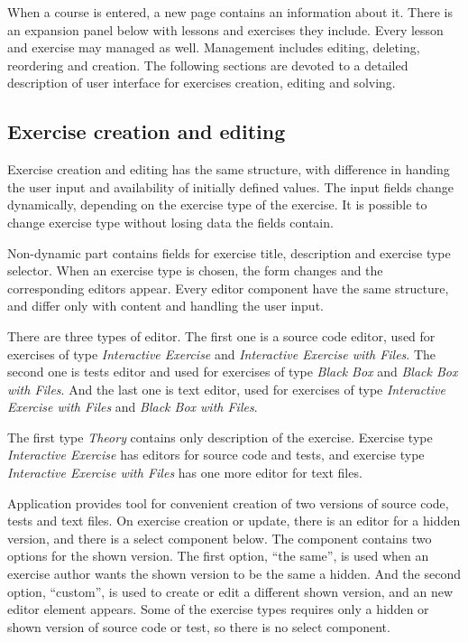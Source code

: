         When a course is entered, a new page contains an information about it. There is an expansion panel below with lessons and exercises they include. Every lesson and exercise may managed as well. Management includes editing, deleting, reordering and creation. The following sections are devoted to a detailed description of user interface for exercises creation, editing and solving.
    
        \subsection{Exercise creation and editing}
        Exercise creation and editing has the same structure, with difference in handing the user input and availability of initially defined values. The input fields change dynamically, depending on the exercise type of the exercise. It is possible to change exercise type without losing data the fields contain.
        
        Non-dynamic part contains fields for exercise title, description and exercise type selector. When an exercise type is chosen, the form changes and the corresponding editors appear. Every editor component have the same structure, and differ only with content and handling the user input.
        
        There are three types of editor. The first one is a source code editor, used for exercises of type \textit{Interactive Exercise} and \textit{Interactive Exercise with Files}. The second one is tests editor and used for exercises of type \textit{Black Box} and \textit{Black Box with Files}. And the last one is text editor, used for exercises of type \textit{Interactive Exercise with Files} and \textit{Black Box with Files}.
        
        The first type \textit{Theory} contains only description of the exercise. Exercise type \textit{Interactive Exercise} has editors for source code and tests, and exercise type \textit{Interactive Exercise with Files} has one more editor for text files.
        
        Application provides tool for convenient creation of two versions of source code, tests and text files. On exercise creation or update, there is an editor for a hidden version, and there is a select component below. The component contains two options for the shown version. The first option, ``the same'', is used when an exercise author wants the shown version to be the same a hidden. And the second option, ``custom'', is used to create or edit a different shown version, and an new editor element appears. Some of the exercise types requires only a hidden or shown version of source code or test, so there is no select component.
        
